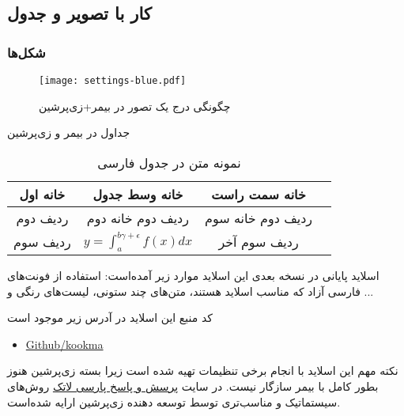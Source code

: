 \documentclass{beamer}
\makeatletter
\newcommand{ \RTList}{\raggedleft\rightskip\@totalleftmargin}
\makeatother
\begin{document}
\begin{persian}
\section{کار با تصویر و جدول}

\begin{frame}
\frametitle{شکل‌ها}
\begin{figure}
	\centering
	\texttt{[image: settings-blue.pdf]}
	\caption[نمونه تصویر]{چگونگی درج یک تصور در بیمر+زی‌پرشین}
	\label{fig:pic1}
\end{figure}
\end{frame}


\begin{frame}{جداول در بیمر و زی‌پرشین}
\begin{table}
\caption{نمونه متن در جدول فارسی}
\begin{tabular}{|c|c|c|c|}
	\hline 
خانه اول	& خانه وسط جدول &خانه سمت راست    \\ 
	\hline 
ردیف دوم	&  ردیف دوم خانه دوم& ردیف دوم خانه سوم   \\ 
	\hline 
ردیف سوم	&
$ y=\int_{a}^{b\gamma+\epsilon} f(x) dx $
& ردیف سوم آخر   \\ 
	\hline 
\end{tabular} 
\end{table}
\end{frame}

\begin{frame}{اسلاید پایانی}
در نسخه بعدی این اسلاید موارد زیر  آمده‌است: استفاده از فونت‌های فارسی آزاد که مناسب اسلاید هستند، متن‌های چند ستونی، لیست‌های رنگی و ...

کد منبع این اسلاید در آدرس زیر موجود است
\begin{itemize}\RTList
	\item \href{https://github.com/kookma/Persian-Beamer-Templates}{Github/kookma}
\end{itemize}

\begin{alertblock}{نکته مهم}
	این اسلاید با انجام برخی تنظیمات تهیه شده است زیرا بسته زی‌پرشین هنوز بطور کامل با بیمر سازگار نیست. در سایت 
	\href{http://qa.parsilatex.com}{پرسش و پاسخ پارسی لاتک}
 روش‌های سیستماتیک و مناسب‌تری توسط توسعه دهنده زی‌پرشین ارایه شده‌است.
\end{alertblock}


\end{frame}

\end{persian}
\end{document}

